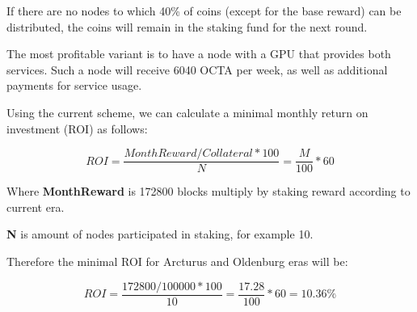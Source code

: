 If there are no nodes to which 40\% of coins (except for the base reward) can be distributed, the coins will remain in the staking fund for the next round.

The most profitable variant is to have a node with a GPU that provides both services. Such a node will receive 6040 OCTA per week, as well as additional payments for service usage.

Using the current scheme, we can calculate a minimal monthly return on investment (ROI) as follows:

\[
    ROI = \frac{MonthReward / Collateral * 100}{N} = \frac{M}{100} * 60
\]

Where \textbf{MonthReward} is 172800 blocks multiply by staking reward according to current era.

\textbf{N} is amount of nodes participated in staking, for example 10.

Therefore the minimal ROI for Arcturus and Oldenburg eras will be:

\[
    ROI = \frac{172800 / 100000 * 100}{10} = \frac{17.28}{100} * 60 = 10.36\%
\]

